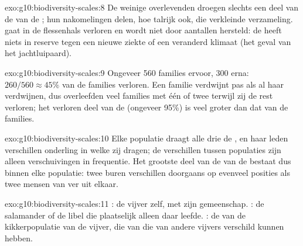 \begin{solution}{exo:g10:biodiversity-scales:8}
De weinige overlevenden droegen slechts een deel van de  van de
; hun nakomelingen delen, hoe talrijk ook, die verkleinde
verzameling.  gaat in de flessenhals verloren en
wordt niet door aantallen hersteld: de  heeft niets in reserve
tegen een nieuwe ziekte of een veranderd klimaat (het geval van het
jachtluipaard).
\end{solution}

\begin{solution}{exo:g10:biodiversity-scales:9}
Ongeveer 560 families ervoor, 300 erna: $260/560 \approx 45\%$ van de
families verloren. Een familie verdwijnt pas als al haar 
verdwijnen, dus overleefden veel families met één of twee 
terwijl zij de rest verloren; het verloren deel van de 
(ongeveer 95\%) is veel groter dan dat van de families.
\end{solution}

\begin{solution}{exo:g10:biodiversity-scales:10}
Elke populatie draagt alle drie de , en haar leden verschillen
onderling in welke zij dragen; de verschillen tussen populaties zijn
alleen verschuivingen in frequentie. Het grootste deel van de  van de  bestaat dus binnen elke populatie: twee buren
verschillen doorgaans op evenveel posities als twee mensen van ver uit
elkaar.
\end{solution}

\begin{solution}{exo:g10:biodiversity-scales:11}
: de vijver zelf, met zijn gemeenschap. : de salamander
of de libel die plaatselijk alleen daar leefde. : de  van de
kikkerpopulatie van de vijver, die van die van andere vijvers verschild
kunnen hebben.
\end{solution}

